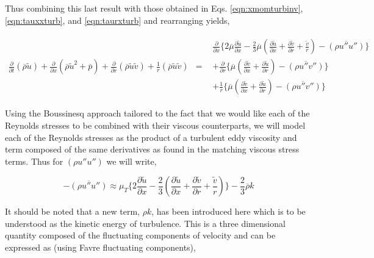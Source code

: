 	Thus combining this last result with those obtained in Eqs. \ref{eqn:xmomturbinv}, \ref{eqn:tauxxturb},
and \ref{eqn:taurxturb} and rearranging yields,

\begin{displaymath}
	\begin{array}{ccc}
	\frac{\partial}{\partial t}(\overline{\rho}\tilde{u}) + \frac{\partial}{\partial x}(
	\overline{\rho}\tilde{u}^2 + \overline{p}) + \frac{\partial}{\partial r}(
	\overline{\rho}\tilde{u}\tilde{v}) + \frac{1}{r}(\overline{\rho}\tilde{u}\tilde{v}) 
	& = & 
		\begin{array}{c} 
	\frac{\partial}{\partial x}\Big\{
	2\overline{\mu}\frac{\partial \tilde{u}}{\partial x} - \frac{2}{3}\overline{\mu} (\frac{\partial \tilde{u}}
	{\partial x} + \frac{\partial \tilde{v}}{\partial r} + \frac{\tilde{v}}{r}) - \overline{(\rho u'' u'')} \Big\}
	\\ + \frac{\partial}{\partial r}\Big\{\overline{\mu} 
	(\frac{\partial \tilde{v}}{\partial x} + \frac{\partial \tilde{u}}{\partial r}) - \overline{(\rho u'' v'')}\Big\}\\
	+ \frac{1}{r}\Big\{\overline{\mu}
	(\frac{\partial \tilde{v}}{\partial x} + \frac{\partial \tilde{u}}{\partial r}) - \overline{(\rho u'' v'')}\Big\}	
		\end{array}
	\end{array}
\end{displaymath}

	Using the Boussinesq approach tailored to the fact that we would like each of the Reynolds stresses to be
combined with their viscous counterparts, we will model each of the Reynolds stresses as the product of a turbulent
eddy viscosity and term composed of the same derivatives as found in the matching viscous stress terms.  Thus for
$(\rho u'' u'')$ we will write,

\begin{equation}
	-\overline{(\rho u'' u'')} \approx \mu_T\Big\{2\frac{\partial \tilde{u}}{\partial x} - \frac{2}{3}
	(\frac{\partial \tilde{u}}{\partial x} + \frac{\partial \tilde{v}}{\partial r} + \frac{\tilde{v}}{r})\Big\}
	-\frac{2}{3}\overline{\rho}k
\label{eqn:rhouu}
\end{equation}

	It should be noted that a new term, $\rho k $, has been introduced here which is to be understood as the kinetic
energy of turbulence.  This is a three dimensional quantity composed of the fluctuating components of velocity and
can be expressed as (using Favre fluctuating components),


